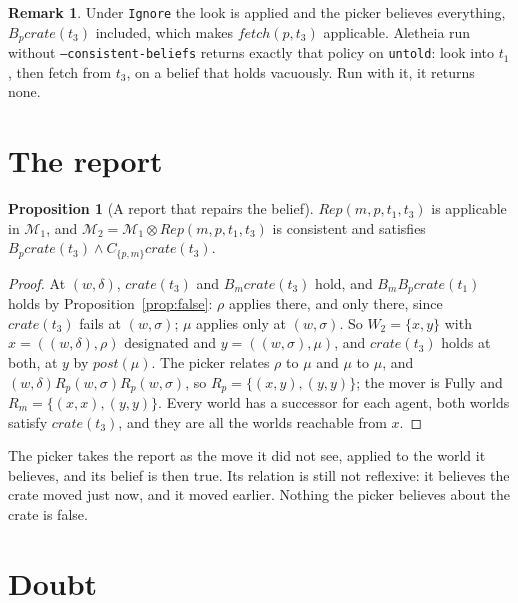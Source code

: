 \documentclass[11pt,a4paper]{article}
\theoremstyle{definition}
\newtheorem{proposition}{Proposition}
\newtheorem{remark}{Remark}
\newcommand{\Mod}{\mathcal{M}}
\newcommand{\prd}{\otimes}
\newcommand{\Bop}[1]{B_{#1}}
\newcommand{\Cop}[1]{C_{#1}}
\newcommand{\code}[1]{\texttt{\small #1}}
\newcommand{\ag}[1]{\mathit{#1}}
\newcommand{\pk}{\ag{p}}
\newcommand{\mv}{\ag{m}}
\newcommand{\crate}{\mathit{crate}}
\newcommand{\post}{\mathit{post}}
\begin{document}
\begin{remark}
\label{rem:vacuous}
Under \code{Ignore} the look is applied and the picker believes everything,
$\Bop{\pk}\crate(t_3)$ included, which makes $\mathit{fetch}(\pk, t_3)$
applicable. Aletheia run without \code{--consistent-beliefs} returns exactly
that policy on \code{untold}: look into $t_1$, then fetch from $t_3$, on a
belief that holds vacuously. Run with it, it returns none.
\end{remark}

\section{The report}
\label{sec:report}

\begin{proposition}[A report that repairs the belief]
\label{prop:report}
$\mathit{Rep}(\mv, \pk, t_1, t_3)$ is applicable in $\Mod_1$, and
$\Mod_2 = \Mod_1 \prd \mathit{Rep}(\mv, \pk, t_1, t_3)$ is consistent and satisfies
$\Bop{\pk}\crate(t_3) \wedge \Cop{\{\pk,\mv\}}\crate(t_3)$.
\end{proposition}

\begin{proof}
At $(w,\delta)$, $\crate(t_3)$ and $\Bop{\mv}\crate(t_3)$ hold, and
$\Bop{\mv}\Bop{\pk}\crate(t_1)$ holds by Proposition~\ref{prop:false}: $\rho$
applies there, and only there, since $\crate(t_3)$ fails at $(w,\sigma)$; $\mu$
applies only at $(w,\sigma)$. So $W_2 = \{x, y\}$ with $x = ((w,\delta),\rho)$
designated and $y = ((w,\sigma),\mu)$, and $\crate(t_3)$ holds at both, at $y$ by
$\post(\mu)$. The picker relates $\rho$ to $\mu$ and $\mu$ to $\mu$, and
$(w,\delta) R_\pk (w,\sigma) R_\pk (w,\sigma)$, so $R_\pk = \{(x,y),(y,y)\}$; the
mover is Fully and $R_\mv = \{(x,x),(y,y)\}$. Every world has a successor for
each agent, both worlds satisfy $\crate(t_3)$, and they are all the worlds
reachable from $x$.
\end{proof}

\noindent
The picker takes the report as the move it did not see, applied to the world
it believes, and its belief is then true. Its relation is still not reflexive:
it believes the crate moved just now, and it moved earlier. Nothing the picker
believes about the crate is false.

\section{Doubt}
\label{sec:doubt}
\end{document}

